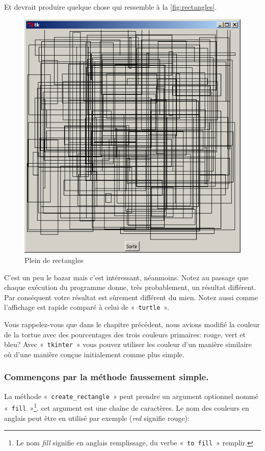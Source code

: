 Et devrait produire quelque chose qui ressemble à la \autoref{fig:rectangles}.
\begin{figure}[h!]
\centering
\includegraphics[scale=0.4]{images/rectangles}
\caption{Plein de rectangles}\label{fig:rectangles}
\end{figure}

C'est un peu le bazar mais c'est intéressant, néanmoins.
Notez au passage que chaque exécution du programme donne, très probablement, un résultat différent. Par conséquent votre résultat est sûrement différent du mien. Notez aussi comme l'affichage est rapide comparé à celui de «~\texttt{turtle}~».

Vous rappelez-vous que dans le chapitre précédent, nous avions modifié la couleur de la tortue avec des pourcentages des trois couleurs primaires: rouge, vert et bleu? Avec «~\texttt{tkinter}~» vous pouvez utiliser les couleur d'un manière similaire où d'une manière conçue initialement comme plus simple.

\subsubsection*{Commençons par la méthode faussement simple.}
La méthode «~\texttt{create\_rectangle}~» peut prendre un argument optionnel nommé «~\texttt{fill}~»\footnote{Le nom \emph{fill} signifie en anglais remplissage, du verbe «~\texttt{to fill}~» remplir.}. cet argument est une chaîne de caractères. Le nom des couleurs en anglais peut être en utilisé par exemple (\emph{red} signifie rouge):

